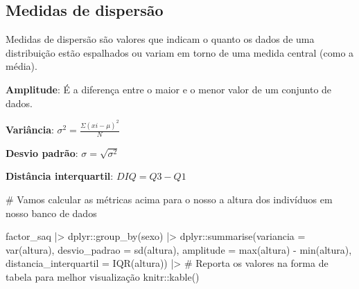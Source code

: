 \documentclass[
  letterpaper,
  DIV=11,
  numbers=noendperiod]{scrartcl}
\newenvironment{Shaded}{\begin{snugshade}}{\end{snugshade}}
\newcommand{\AttributeTok}[1]{\textcolor[rgb]{0.40,0.45,0.13}{#1}}
\newcommand{\CommentTok}[1]{\textcolor[rgb]{0.37,0.37,0.37}{#1}}
\newcommand{\FunctionTok}[1]{\textcolor[rgb]{0.28,0.35,0.67}{#1}}
\newcommand{\NormalTok}[1]{\textcolor[rgb]{0.00,0.23,0.31}{#1}}
\newcommand{\SpecialCharTok}[1]{\textcolor[rgb]{0.37,0.37,0.37}{#1}}
\begin{document}
\hypertarget{medidas-de-dispersuxe3o}{%
\subsection{Medidas de dispersão}\label{medidas-de-dispersuxe3o}}

Medidas de dispersão são valores que indicam o quanto os dados de uma
distribuição estão espalhados ou variam em torno de uma medida central
(como a média).

\textbf{Amplitude}: É a diferença entre o maior e o menor valor de um
conjunto de dados.

\textbf{Variância}: \(\sigma^2 = \frac{\Sigma(xi-\mu)^2}{N}\)

\textbf{Desvio padrão}: \(\sigma = \sqrt{\sigma^2}\)

\textbf{Distância interquartil}: \(DIQ = Q3 - Q1\)

\begin{Shaded}
\begin{Highlighting}[]
\CommentTok{\# Vamos calcular as métricas acima para o nosso a altura dos indivíduos em nosso banco de dados}

\NormalTok{factor\_saq }\SpecialCharTok{|\textgreater{}} 
\NormalTok{  dplyr}\SpecialCharTok{::}\FunctionTok{group\_by}\NormalTok{(sexo) }\SpecialCharTok{|\textgreater{}} 
\NormalTok{  dplyr}\SpecialCharTok{::}\FunctionTok{summarise}\NormalTok{(}\AttributeTok{variancia =} \FunctionTok{var}\NormalTok{(altura), }\AttributeTok{desvio\_padrao =} \FunctionTok{sd}\NormalTok{(altura), }\AttributeTok{amplitude =} \FunctionTok{max}\NormalTok{(altura) }\SpecialCharTok{{-}} \FunctionTok{min}\NormalTok{(altura), }\AttributeTok{distancia\_interquartil =} \FunctionTok{IQR}\NormalTok{(altura))  }\SpecialCharTok{|\textgreater{}} 
  \CommentTok{\# Reporta os valores na forma de tabela para melhor visualização}
\NormalTok{  knitr}\SpecialCharTok{::}\FunctionTok{kable}\NormalTok{()}
\end{Highlighting}
\end{Shaded}
\end{document}
